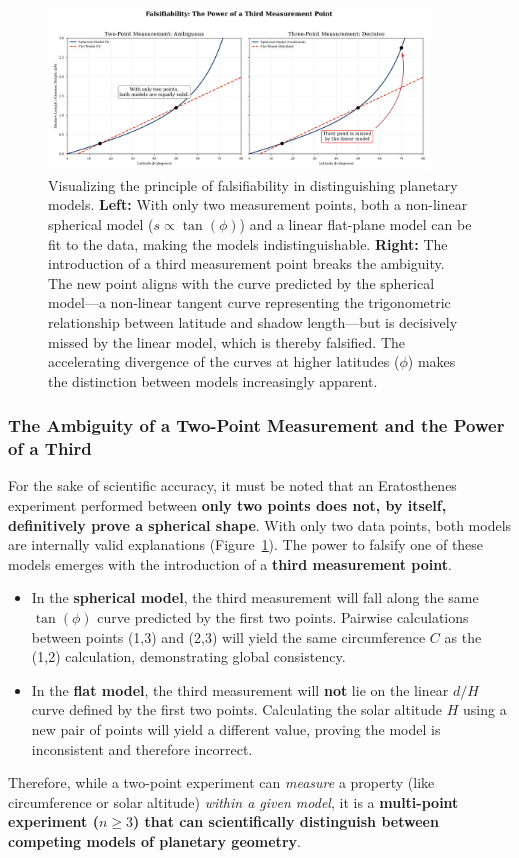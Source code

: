 \documentclass[11pt]{article}
\begin{document}
\begin{figure}[htbp]
    \centering
    \includegraphics[width=0.9\textwidth]{figures/figure_14_twopoint_vs_threepoint.png}
    \caption{
        Visualizing the principle of falsifiability in distinguishing planetary models. 
        \textbf{Left:} With only two measurement points, both a non-linear spherical model ($s \propto \tan(\phi)$) and a linear flat-plane model can be fit to the data, making the models indistinguishable. 
        \textbf{Right:} The introduction of a third measurement point breaks the ambiguity. The new point aligns with the curve predicted by the spherical model—a non-linear tangent curve representing the trigonometric relationship between latitude and shadow length—but is decisively missed by the linear model, which is thereby falsified. The accelerating divergence of the curves at higher latitudes ($\phi$) makes the distinction between models increasingly apparent.
    }
    \label{fig:falsifiability}
\end{figure}

\subsubsection{The Ambiguity of a Two-Point Measurement and the Power of a Third}
For the sake of scientific accuracy, it must be noted that an Eratosthenes experiment performed between \textbf{only two points does not, by itself, definitively prove a spherical shape}. With only two data points, both models are internally valid explanations (Figure~\ref{fig:falsifiability}). The power to falsify one of these models emerges with the introduction of a \textbf{third measurement point}.
\begin{itemize}
    \item In the \textbf{spherical model}, the third measurement will fall along the same $\tan(\phi)$ curve predicted by the first two points. Pairwise calculations between points (1,3) and (2,3) will yield the same circumference $C$ as the (1,2) calculation, demonstrating global consistency.
    \item In the \textbf{flat model}, the third measurement will \textbf{not} lie on the linear $d/H$ curve defined by the first two points. Calculating the solar altitude $H$ using a new pair of points will yield a different value, proving the model is inconsistent and therefore incorrect.
\end{itemize}
Therefore, while a two-point experiment can \textit{measure} a property (like circumference or solar altitude) \textit{within a given model}, it is a \textbf{multi-point experiment ($n \ge 3$) that can scientifically distinguish between competing models of planetary geometry}.
\end{document}
